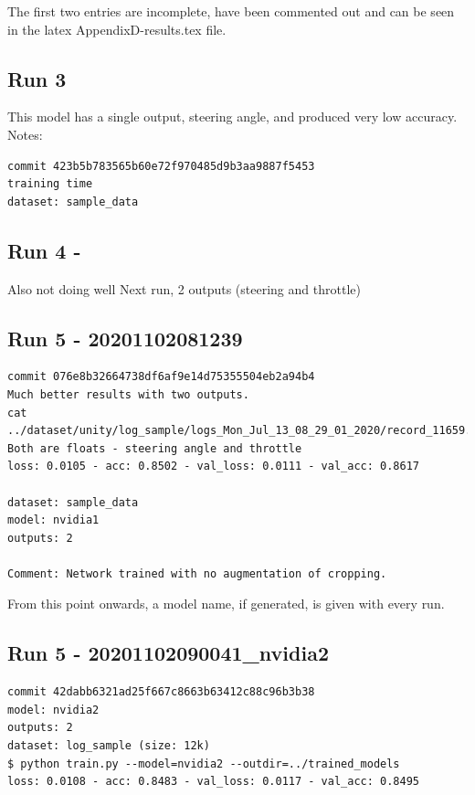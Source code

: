 The first two entries are incomplete, have been commented out and can be seen in the latex AppendixD-results.tex file.


\subsection{Run 3}

This model has a single output, steering angle, and produced very low accuracy.
Notes:
\begin{verbatim}
commit 423b5b783565b60e72f970485d9b3aa9887f5453
training time
dataset: sample_data
\end{verbatim}

\subsection{Run 4 - }

Also not doing well
Next run, 2 outputs (steering and throttle)

\subsection{Run 5 - 20201102081239} 

\begin{verbatim}
commit 076e8b32664738df6af9e14d75355504eb2a94b4
Much better results with two outputs. 
cat ../dataset/unity/log_sample/logs_Mon_Jul_13_08_29_01_2020/record_11659.json
Both are floats - steering angle and throttle
loss: 0.0105 - acc: 0.8502 - val_loss: 0.0111 - val_acc: 0.8617

dataset: sample_data
model: nvidia1
outputs: 2

Comment: Network trained with no augmentation of cropping.

\end{verbatim}

From this point onwards, a model name, if generated, is given with every run.

\subsection{Run 5 - 20201102090041\_nvidia2}
\begin{verbatim}
commit 42dabb6321ad25f667c8663b63412c88c96b3b38
model: nvidia2
outputs: 2
dataset: log_sample (size: 12k)
$ python train.py --model=nvidia2 --outdir=../trained_models
loss: 0.0108 - acc: 0.8483 - val_loss: 0.0117 - val_acc: 0.8495
\end{verbatim}


